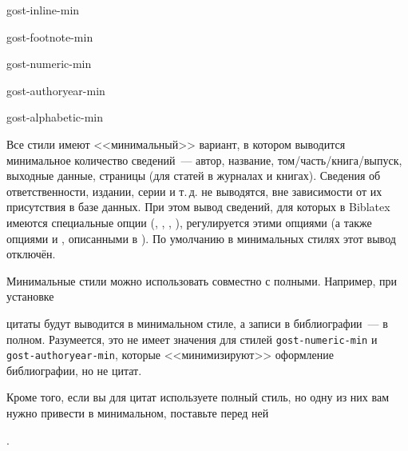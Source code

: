 \documentclass[10pt,a4paper,headings=small,numbers=enddot,english,russian]{ltxdockit}[2011/03/25]
\newcommand*{\biblatex}{Biblatex\xspace}
\newcommand*{\bibsty}{\texttt}
\begin{document}
\begin{marglist}
\item[gost-inline-min]%
\item[gost-footnote-min]\vspace{-\itemsep}\vspace{-\parsep}%
\item[gost-numeric-min]\vspace{-\itemsep}\vspace{-\parsep}%
\item[gost-authoryear-min]\vspace{-\itemsep}\vspace{-\parsep}%
\item[gost-alphabetic-min]\vspace{-\itemsep}\vspace{-\parsep}%
\item\vspace{-\itemsep}\vspace{-\parsep}%
\vspace{-4\baselineskip}%
Все стили имеют <<минимальный>> вариант, в котором выводится минимальное количество
сведений~--- автор, название, том\slash часть\slash книга\slash выпуск,
выходные данные, страницы (для статей в журналах и книгах).
Сведения об ответственности, издании, серии и т.\,д. не выводятся, вне зависимости от их присутствия в базе данных.
При этом вывод сведений, для которых в \biblatex имеются специальные опции
(, , , ), регулируется
этими опциями (а также опциями  и ,
описанными в ). По умолчанию в минимальных стилях этот вывод отключён.

Минимальные стили можно использовать совместно с полными.
Например, при установке

\begin{ltxcode}
\usepackage[%
    citestyle=gost-footnote-min,
    bibstyle=gost-footnote,
    ...
]{biblatex}
\end{ltxcode}

цитаты будут выводится в минимальном стиле, а записи в библиографии~--- в полном.
Разумеется, это не имеет значения для стилей \bibsty{gost-numeric-min} и
\bibsty{gost-authoryear-min}, которые <<минимизируют>> оформление библиографии, но не цитат.

Кроме того, если вы для цитат используете полный стиль, но одну из них вам нужно привести
в минимальном, поставьте перед ней

\begin{ltxcode}
.
\end{ltxcode}

\end{marglist}
\end{document}
